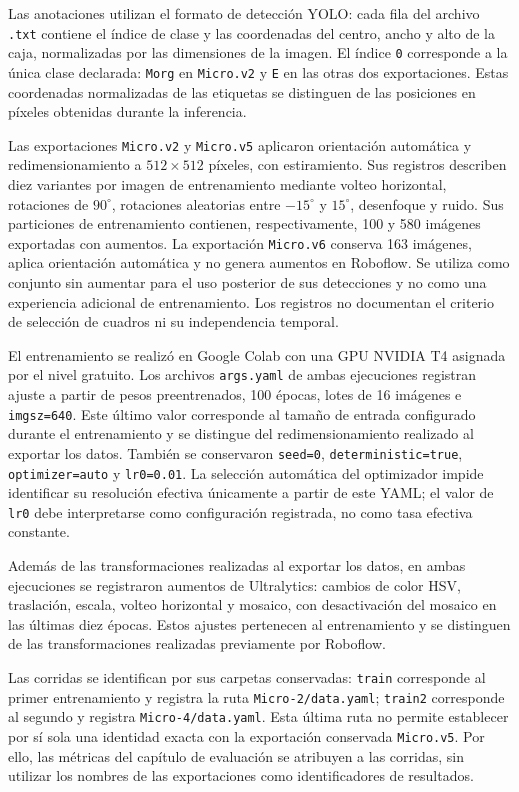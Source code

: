 Las anotaciones utilizan el formato de detección YOLO: cada fila del archivo \texttt{.txt} contiene el índice de clase y las coordenadas del centro, ancho y alto de la caja, normalizadas por las dimensiones de la imagen. El índice \texttt{0} corresponde a la única clase declarada: \texttt{Morg} en \texttt{Micro.v2} y \texttt{E} en las otras dos exportaciones. Estas coordenadas normalizadas de las etiquetas se distinguen de las posiciones en píxeles obtenidas durante la inferencia.

Las exportaciones \texttt{Micro.v2} y \texttt{Micro.v5} aplicaron orientación automática y redimensionamiento a $512\times512$ píxeles, con estiramiento. Sus registros describen diez variantes por imagen de entrenamiento mediante volteo horizontal, rotaciones de $90^\circ$, rotaciones aleatorias entre $-15^\circ$ y $15^\circ$, desenfoque y ruido. Sus particiones de entrenamiento contienen, respectivamente, 100 y 580 imágenes exportadas con aumentos. La exportación \texttt{Micro.v6} conserva 163 imágenes, aplica orientación automática y no genera aumentos en Roboflow. Se utiliza como conjunto sin aumentar para el uso posterior de sus detecciones y no como una experiencia adicional de entrenamiento. Los registros no documentan el criterio de selección de cuadros ni su independencia temporal.

El entrenamiento se realizó en Google Colab con una GPU NVIDIA T4 asignada por el nivel gratuito. Los archivos \texttt{args.yaml} de ambas ejecuciones registran ajuste a partir de pesos preentrenados, 100 épocas, lotes de 16 imágenes e \texttt{imgsz=640}. Este último valor corresponde al tamaño de entrada configurado durante el entrenamiento y se distingue del redimensionamiento realizado al exportar los datos. También se conservaron \texttt{seed=0}, \texttt{deterministic=true}, \texttt{optimizer=auto} y \texttt{lr0=0.01}. La selección automática del optimizador impide identificar su resolución efectiva únicamente a partir de este YAML; el valor de \texttt{lr0} debe interpretarse como configuración registrada, no como tasa efectiva constante.

Además de las transformaciones realizadas al exportar los datos, en ambas ejecuciones se registraron aumentos de Ultralytics: cambios de color HSV, traslación, escala, volteo horizontal y mosaico, con desactivación del mosaico en las últimas diez épocas. Estos ajustes pertenecen al entrenamiento y se distinguen de las transformaciones realizadas previamente por Roboflow.

Las corridas se identifican por sus carpetas conservadas: \texttt{train} corresponde al primer entrenamiento y registra la ruta \texttt{Micro-2/data.yaml}; \texttt{train2} corresponde al segundo y registra \texttt{Micro-4/data.yaml}. Esta última ruta no permite establecer por sí sola una identidad exacta con la exportación conservada \texttt{Micro.v5}. Por ello, las métricas del capítulo de evaluación se atribuyen a las corridas, sin utilizar los nombres de las exportaciones como identificadores de resultados.

